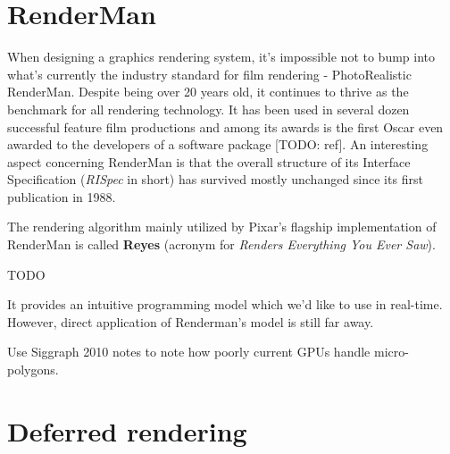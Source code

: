 \section{RenderMan}

When designing a graphics rendering system, it's impossible not to bump into what's currently the industry standard for film rendering - PhotoRealistic RenderMan. Despite being over 20 years old, it continues to thrive as the benchmark for all rendering technology. It has been used in several dozen successful feature film productions and among its awards is the first Oscar even awarded to the developers of a software package [TODO: ref]. An interesting aspect concerning RenderMan is that the overall structure of its Interface Specification (\emph{RISpec} in short) has survived mostly unchanged since its first publication in 1988.


The rendering algorithm mainly utilized by Pixar's flagship implementation of RenderMan is called \textbf{Reyes} (acronym for \emph{Renders Everything You Ever Saw}).

TODO

It provides an intuitive programming model which we'd like to use in real-time. However, direct application of Renderman's model is still far away.

Use Siggraph 2010 notes to note how poorly current GPUs handle micro-polygons.

\section{Deferred rendering}

